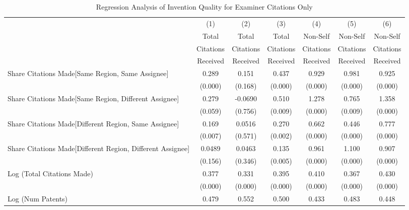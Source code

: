 \begin{table}[htbp]\centering \caption{Regression Analysis of Invention Quality for Examiner Citations Only \label{e.model123192021}}
\scriptsize
\singlespacing
\begin{tabular}{l*{6}{c}} \hline
                &\multicolumn{1}{c}{(1)}&\multicolumn{1}{c}{(2)}&\multicolumn{1}{c}{(3)}&\multicolumn{1}{c}{(4)}&\multicolumn{1}{c}{(5)}&\multicolumn{1}{c}{(6)}\\
                &\multicolumn{1}{c}{Total}&\multicolumn{1}{c}{Total}&\multicolumn{1}{c}{Total}&\multicolumn{1}{c}{Non-Self}&\multicolumn{1}{c}{Non-Self}&\multicolumn{1}{c}{Non-Self}\\
                &\multicolumn{1}{c}{Citations}&\multicolumn{1}{c}{Citations}&\multicolumn{1}{c}{Citations}&\multicolumn{1}{c}{Citations}&\multicolumn{1}{c}{Citations}&\multicolumn{1}{c}{Citations}\\
                 &\multicolumn{1}{c}{Received}&\multicolumn{1}{c}{Received}&\multicolumn{1}{c}{Received}&\multicolumn{1}{c}{Received}&\multicolumn{1}{c}{Received}&\multicolumn{1}{c}{Received}\\
\hline
Share Citations Made[Same Region, Same Assignee]&    0.289&    0.151&    0.437&    0.929&    0.981&    0.925\\
                &  (0.000)&  (0.168)&  (0.000)&  (0.000)&  (0.000)&  (0.000)\\
Share Citations Made[Same Region, Different Assignee]&    0.279&  -0.0690&    0.510&    1.278&    0.765&    1.358\\
                &  (0.059)&  (0.756)&  (0.009)&  (0.000)&  (0.009)&  (0.000)\\
Share Citations Made[Different Region, Same Assignee]&    0.169&   0.0516&    0.270&    0.662&    0.446&    0.777\\
                &  (0.007)&  (0.571)&  (0.002)&  (0.000)&  (0.000)&  (0.000)\\
Share Citations Made[Different Region, Different Assignee]&   0.0489&   0.0463&    0.135&    0.961&    1.100&    0.907\\
                &  (0.156)&  (0.346)&  (0.005)&  (0.000)&  (0.000)&  (0.000)\\
Log (Total Citations Made)&    0.377&    0.331&    0.395&    0.410&    0.367&    0.430\\
                &  (0.000)&  (0.000)&  (0.000)&  (0.000)&  (0.000)&  (0.000)\\
Log (Num Patents)&    0.479&    0.552&    0.500&    0.433&    0.483&    0.448\\

\end{tabular}
\end{table}
